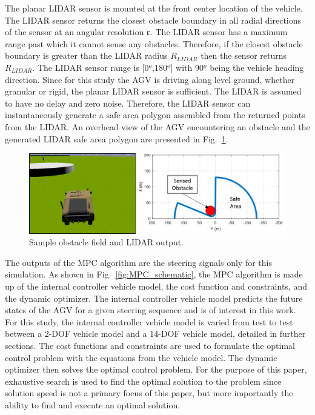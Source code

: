 \documentclass[12pt,twocolumn]{article}
\begin{document}
The planar LIDAR sensor is mounted at the front center location of the vehicle. The LIDAR sensor returns the closest obstacle boundary in all radial directions of the sensor at an angular resolution ε. The LIDAR sensor has a maximum range past which it cannot sense any obstacles. Therefore, if the closest obstacle boundary is greater than the LIDAR radius $R_{LIDAR}$ then the sensor returns $R_{LIDAR}$. The LIDAR sensor range is [0$^o$,180$^o$] with 90$^o$ being the vehicle heading direction. Since for this study the AGV is driving along level ground, whether granular or rigid, the planar LIDAR sensor is sufficient. The LIDAR is assumed to have no delay and zero noise. Therefore, the LIDAR sensor can instantaneously generate a safe area polygon assembled from the returned points from the LIDAR. An overhead view of the AGV encountering an obstacle and the generated LIDAR safe area polygon are presented in Fig.~\ref{fig:obstacle_field}. 
%
\begin{figure}
	\centering
	\includegraphics[width=\columnwidth]{Figs/LIDARExample.png}
	\caption{\small Sample obstacle field and LIDAR output.}    
	\label{fig:obstacle_field}
\end{figure}
	
The outputs of the MPC algorithm are the steering signals only for this simulation. As shown in Fig.~\ref{fig:MPC_schematic}, the MPC algorithm is made up of the internal controller vehicle model, the cost function and constraints, and the dynamic optimizer. The internal controller vehicle model predicts the future states of the AGV for a given steering sequence and is of interest in this work. For this study, the internal controller vehicle model is varied from test to test between a 2-DOF vehicle model and a 14-DOF vehicle model, detailed in further sections. The cost functions and constraints are used to formulate the optimal control problem with the equations from the vehicle model. The dynamic optimizer then solves the optimal control problem. For the purpose of this paper, exhaustive search is used to find the optimal solution to the problem since solution speed is not a primary focus of this paper, but more importantly the ability to find and execute an optimal solution.
\end{document}
